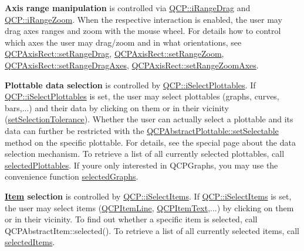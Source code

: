 {\bfseries Axis range manipulation} is controlled via \hyperlink{namespace_q_c_p_a2ad6bb6281c7c2d593d4277b44c2b037a15aab687b04f7ecf86506102b41b0900}{Q\+C\+P\+::i\+Range\+Drag} and \hyperlink{namespace_q_c_p_a2ad6bb6281c7c2d593d4277b44c2b037ae91a9794d8323fe08229dda97d2c17a0}{Q\+C\+P\+::i\+Range\+Zoom}. When the respective interaction is enabled, the user may drag axes ranges and zoom with the mouse wheel. For details how to control which axes the user may drag/zoom and in what orientations, see \hyperlink{class_q_c_p_axis_rect_ae6aef2f7211ba6097c925dcd26008418}{Q\+C\+P\+Axis\+Rect\+::set\+Range\+Drag}, \hyperlink{class_q_c_p_axis_rect_a7960a9d222f1c31d558b064b60f86a31}{Q\+C\+P\+Axis\+Rect\+::set\+Range\+Zoom}, \hyperlink{class_q_c_p_axis_rect_a648cce336bd99daac4a5ca3e5743775d}{Q\+C\+P\+Axis\+Rect\+::set\+Range\+Drag\+Axes}, \hyperlink{class_q_c_p_axis_rect_a9442cca2aa358405f39a64d51eca13d2}{Q\+C\+P\+Axis\+Rect\+::set\+Range\+Zoom\+Axes}.

{\bfseries Plottable data selection} is controlled by \hyperlink{namespace_q_c_p_a2ad6bb6281c7c2d593d4277b44c2b037ab4ac8dbba56ed6ef7d1355895707d6a5}{Q\+C\+P\+::i\+Select\+Plottables}. If \hyperlink{namespace_q_c_p_a2ad6bb6281c7c2d593d4277b44c2b037ab4ac8dbba56ed6ef7d1355895707d6a5}{Q\+C\+P\+::i\+Select\+Plottables} is set, the user may select plottables (graphs, curves, bars,...) and their data by clicking on them or in their vicinity (\hyperlink{class_q_custom_plot_a4dc31241d7b09680950e19e5f971ed93}{set\+Selection\+Tolerance}). Whether the user can actually select a plottable and its data can further be restricted with the \hyperlink{class_q_c_p_abstract_plottable_ac238d6e910f976f1f30d41c2bca44ac3}{Q\+C\+P\+Abstract\+Plottable\+::set\+Selectable} method on the specific plottable. For details, see the special page about the data selection mechanism. To retrieve a list of all currently selected plottables, call \hyperlink{class_q_custom_plot_a6721b8c689bb7f2f400987e580508fe8}{selected\+Plottables}. If you\textquotesingle{}re only interested in Q\+C\+P\+Graphs, you may use the convenience function \hyperlink{class_q_custom_plot_ad2a0493bdd01e7aa99a4209ae3a5b67b}{selected\+Graphs}.

{\bfseries \hyperlink{class_item}{Item} selection} is controlled by \hyperlink{namespace_q_c_p_a2ad6bb6281c7c2d593d4277b44c2b037a271679ebb13ab4a6b4c2c2d9459f1de8}{Q\+C\+P\+::i\+Select\+Items}. If \hyperlink{namespace_q_c_p_a2ad6bb6281c7c2d593d4277b44c2b037a271679ebb13ab4a6b4c2c2d9459f1de8}{Q\+C\+P\+::i\+Select\+Items} is set, the user may select items (\hyperlink{class_q_c_p_item_line}{Q\+C\+P\+Item\+Line}, \hyperlink{class_q_c_p_item_text}{Q\+C\+P\+Item\+Text},...) by clicking on them or in their vicinity. To find out whether a specific item is selected, call Q\+C\+P\+Abstract\+Item\+::selected(). To retrieve a list of all currently selected items, call \hyperlink{class_q_custom_plot_a1a48b13547e2d9ac5cd6927516f47a2e}{selected\+Items}.

